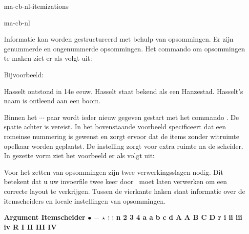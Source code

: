 \startonderdeel ma-cb-nl-itemizations

\produkt ma-cb-nl




Informatie kan worden gestructureerd met behulp van
opsommingen. Er zijn genummerde en ongenummerde opsommingen.
Het commando om opsommingen te maken ziet er als volgt uit:


Bijvoorbeeld:

\startbuffer
{}
\som Hasselt ontstond in 14e eeuw.
\som Hasselt staat bekend als een Hanzestad.
\som Hasselt's naam is ontleend aan een boom.
\stopopsomming
\stopbuffer

\typebuffer

Binnen het \type{\startopsomming} $\cdots$
\type{\stopopsomming} paar wordt ieder nieuw gegeven gestart
met het commando \type{\som}. De spatie achter \type{\som}
is vereist. In het bovenstaande voorbeeld specificeert
 dat een romeinse nummering is gewenst en
 zorgt ervoor dat de items zonder witruimte
opelkaar worden geplaatst. De instelling  zorgt
voor extra ruimte na de scheider. In gezette vorm ziet het
voorbeeld er als volgt uit:

\haalbuffer

Voor het zetten van opsommingen zijn twee verwerkingsslagen
nodig. Dit betekent dat u uw invoerfile twee keer door
\CONTEXT\ moet laten verwerken om een correcte layout te
verkrijgen. Tussen de vierkante haken staat informatie over
de itemscheiders en locale instellingen van opsommingen.

\starttabel[|l|l|]
\HL
\NC \bf Argument \NC \bf Itemscheider \NC\SR
\HL
{}        \NC $\bullet$             \NC\FR
{}        \NC $-$                   \NC\MR
{}        \NC $\star$               \NC\MR
\NC $\vdots$ \NC $\vdots$              \NC\MR
\NC n         2 3 4 \onbekend     \NC\MR
\NC a        \NC a b c d \onbekend     \NC\MR
\NC A        \NC A B C D \onbekend     \NC\MR
\NC r        \NC i ii iii iv \onbekend \NC\MR
\NC R        \NC I II III IV \onbekend \NC\LR
\HL
\stoptabel

